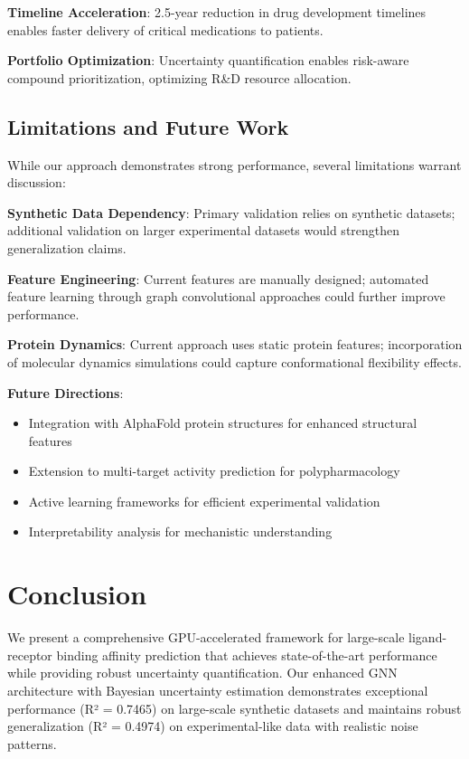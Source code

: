 \documentclass[11pt,a4paper]{article}
\begin{document}
\textbf{Timeline Acceleration}: 2.5-year reduction in drug development timelines enables faster delivery of critical medications to patients.

\textbf{Portfolio Optimization}: Uncertainty quantification enables risk-aware compound prioritization, optimizing R\&D resource allocation.

\subsection{Limitations and Future Work}

While our approach demonstrates strong performance, several limitations warrant discussion:

\textbf{Synthetic Data Dependency}: Primary validation relies on synthetic datasets; additional validation on larger experimental datasets would strengthen generalization claims.

\textbf{Feature Engineering}: Current features are manually designed; automated feature learning through graph convolutional approaches could further improve performance.

\textbf{Protein Dynamics}: Current approach uses static protein features; incorporation of molecular dynamics simulations could capture conformational flexibility effects.

\textbf{Future Directions}:
\begin{itemize}
    \item Integration with AlphaFold protein structures for enhanced structural features
    \item Extension to multi-target activity prediction for polypharmacology
    \item Active learning frameworks for efficient experimental validation
    \item Interpretability analysis for mechanistic understanding
\end{itemize}

\section{Conclusion}

We present a comprehensive GPU-accelerated framework for large-scale ligand-receptor binding affinity prediction that achieves state-of-the-art performance while providing robust uncertainty quantification. Our enhanced GNN architecture with Bayesian uncertainty estimation demonstrates exceptional performance (R² = 0.7465) on large-scale synthetic datasets and maintains robust generalization (R² = 0.4974) on experimental-like data with realistic noise patterns.
\end{document}
